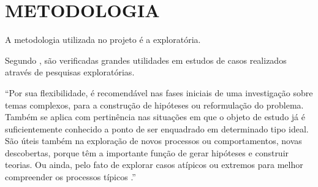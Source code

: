 \chapter{METODOLOGIA}

A metodologia utilizada no projeto é a exploratória.

Segundo , são verificadas grandes utilidades em estudos de casos realizados através de pesquisas exploratórias.

\begin{quoting}[rightmargin=0cm,leftmargin=4cm]
\begin{singlespace}
{\footnotesize  
“Por sua flexibilidade, é recomendável nas fases iniciais de uma investigação sobre temas complexos, para a construção de hipóteses ou reformulação do problema. Também se aplica com pertinência nas situações em que o objeto de estudo já é suficientemente conhecido a ponto de ser enquadrado em determinado tipo ideal. São úteis também na exploração de novos processos ou comportamentos, novas descobertas, porque têm a importante função de gerar hipóteses e construir teorias. Ou ainda, pelo fato de explorar casos atípicos ou extremos para melhor compreender os processos típicos \cite{VENTURA2007}.”
}
\end{singlespace}
\end{quoting}

\begin{comment}
Este estudo tem por finalidade apresentar resultados qualitativos sobre o assunto de visão computacional, visando explorar a didática e o conteúdo metodológico relacionado similarmente à pesquisa.

A pesquisa qualitativa será realizada baseada no livro \textit{Digital Image Processing} \cite{GONZALEZ2002}. Este livro fora escolhido para transmitir o conceito científico e teórico sobre o assunto de visão computacional. O segundo livro que será utilizado para extrair maiores informações sobre o assunto é o Processamento Digital de Imagens \cite{FILHO1999}, que também aborda conteúdos didáticos e científicos sobre o assunto, explicando a funcionalidade da visão computacional, como esta trabalha e a resolução dos problemas sucintos.

Outro livro que será utilizado para a síntese de informações é o \textit{Computer Vision: Algorithms and Applications} \cite{SZELISKI2010}, que cita relações sobre o assunto de forma clara e objetiva.

Portanto, a pesquisa relacionada ao tema desse trabalho será baseada em todos os livros descritos e alguns artigos, com a finalidade de desenvolver o conteúdo teórico sobre o assunto de forma à fácil entendimento.

\end{comment}

